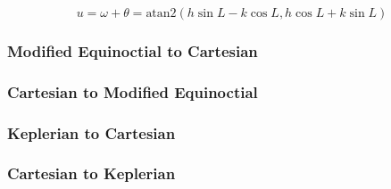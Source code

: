 \begin{equation}
    u = \omega+\theta = \textrm{atan2}(h\sin{L}-k\cos{L},h\cos{L}+k\sin{L})
\end{equation}

\subsubsection{Modified Equinoctial to Cartesian\label{mee2rec}}

\subsubsection{Cartesian to Modified Equinoctial\label{rec2mee}}

\subsubsection{Keplerian to Cartesian\label{kep2rec}}

\subsubsection{Cartesian to Keplerian\label{rec2kep}}

